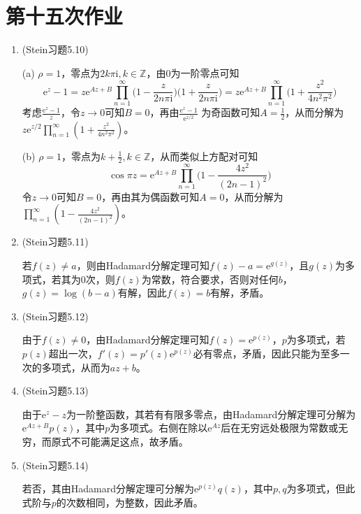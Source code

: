 \documentclass[a4paper,UTF8,fontset=windows]{ctexart}
\begin{document}
\section{第十五次作业}
\begin{enumerate}
    \item (Stein习题5.10)
    
    (a) $\rho=1$，零点为$2k\pi\mathrm{i},k\in\mathbb{Z}$，由0为一阶零点可知
    \[\mathrm{e}^z-1=z\mathrm{e}^{Az+B}\prod_{n=1}^\infty\bigg(1-\frac{z}{2n\pi\mathrm{i}}\bigg)\bigg(1+\frac{z}{2n\pi\mathrm{i}}\bigg)=z\mathrm{e}^{Az+B}\prod_{n=1}^\infty\bigg(1+\frac{z^2}{4n^2\pi^2}\bigg)\]
    考虑$\frac{\mathrm{e}^z-1}{z}$，令$z\to0$可知$B=0$，再由$\frac{\mathrm{e}^z-1}{\mathrm{e}^{z/2}}$
    为奇函数可知$A=\frac{1}{2}$，从而分解为$z\mathrm{e}^{z/2}\prod_{n=1}^\infty(1+\frac{z^2}{4n^2\pi^2})$。
    
    (b) $\rho=1$，零点为$k+\frac{1}{2},k\in\mathbb{Z}$，从而类似上方配对可知
    \[\cos{\pi z}=\mathrm{e}^{Az+B}\prod_{n=1}^\infty\bigg(1-\frac{4z^2}{(2n-1)^2}\bigg)\]
    令$z\to0$可知$B=0$，再由其为偶函数可知$A=0$，从而分解为$\prod_{n=1}^\infty(1-\frac{4z^2}{(2n-1)^2})$。
    
    \item (Stein习题5.11)
    
    若$f(z)\ne a$，则由Hadamard分解定理可知$f(z)-a=\mathrm{e}^{g(z)}$，且$g(z)$为多项式，若其为0次，则$f(z)$为常数，符合要求，否则对任何$b$，$g(z)=\log(b-a)$有解，因此$f(z)=b$有解，矛盾。
    
    \item (Stein习题5.12)
    
    由于$f(z)\ne0$，由Hadamard分解定理可知$f(z)=\mathrm{e}^{p(z)}$，$p$为多项式，若$p(z)$超出一次，$f'(z)=p'(z)\mathrm{e}^{p(z)}$必有零点，矛盾，因此只能为至多一次的多项式，从而为$az+b$。
    
    \item (Stein习题5.13)
    
    由于$\mathrm{e}^z-z$为一阶整函数，其若有有限多零点，由Hadamard分解定理可分解为$\mathrm{e}^{Az+B}p(z)$，其中$p$为多项式。右侧在除以$\mathrm{e}^{Az}$后在无穷远处极限为常数或无穷，而原式不可能满足这点，故矛盾。
    
    \item (Stein习题5.14)
    
    若否，其由Hadamard分解定理可分解为$\mathrm{e}^{p(z)}q(z)$，其中$p,q$为多项式，但此式阶与$p$的次数相同，为整数，因此矛盾。
\end{enumerate}
\end{document}
